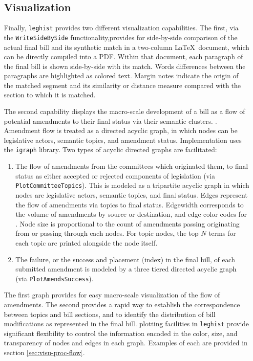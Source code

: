 \documentclass[11pt]{article}
\begin{document}
\subsection{Visualization}
\label{sec:visualization}

Finally, \texttt{leghist} provides two different visualization
capabilities. The first, via the \texttt{WriteSideBySide}
functionality,provides for side-by-side comparison of the actual final
bill and its synthetic match in a two-column \LaTeX\ document, which
can be directly compiled into a PDF. Within that document, each
paragraph of the final bill is shown side-by-side with its
match. Words differences between the paragraphs are highlighted as
colored text. Margin notes indicate the origin of the matched segment
and its similarity or distance measure compared with the section to
which it is matched.

The second capability displays the macro-scale development of a bill
as a flow of potential amendments to their final status via their
semantic clusters. . Amendment flow is treated as a directed acyclic
graph, in which nodes can be legislative actors, semantic topics, and
amendment status. Implementation uses the \texttt{igraph} library. Two
types of acyclic directed graphs are facilitated:

\begin{enumerate}
\item The flow of amendments from the committees which originated
  them, to final status as either accepted or rejected components of
  legislation (via \texttt{PlotCommitteeTopics}). This is modeled as a
  tripartite acyclic graph in which
  nodes are legislative actors, semantic topics, and final
  status. Edges represent the flow of amendments via topics to final
  status. Edgewidth corresponds to the volume of amendments by source
  or destination, and edge color codes for . Node size is proportional
  to the count of amendments passing originating from or passing
  through each nodes. For topic nodes, the top $N$ terms for each
  topic are printed alongside the node itself.
\item The failure, or the success and placement (index) in the final
  bill, of each submitted amendment is modeled by a three tiered
  directed acyclic graph (via \texttt{PlotAmendsSuccess}). 
\end{enumerate}

The first graph provides for easy macro-scale visualization of the
flow of amendments. The second provides a rapid way to establish the
correspondence between topics and bill sections, and to identify the
distribution of bill modifications as represented in the final
bill. plotting facilities in \texttt{leghist} provide significant
flexibility to control the information encoded in the color, size, and
transparency of nodes and edges in each graph. Examples of each are
provided in section \ref{sec:visu-proc-flow}. 
\end{document}
